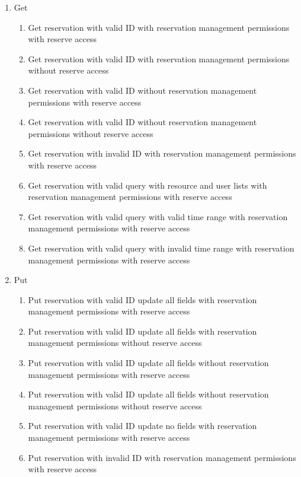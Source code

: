 \documentclass[12pt]{article}
\begin{document}
\begin{enumerate}
\begin{enumerate}
\begin{enumerate}
        \end{enumerate}
        \item Get
        \begin{enumerate}
            \item Get reservation with valid ID with reservation management permissions with reserve access
            \item Get reservation with valid ID with reservation management permissions without reserve access
            \item Get reservation with valid ID without reservation management permissions with reserve access
            \item Get reservation with valid ID without reservation management permissions without reserve access
            \item Get reservation with invalid ID with reservation management permissions with reserve access
            \item Get reservation with valid query with resource and user lists with reservation management permissions with reserve access
            \item Get reservation with valid query with valid time range with reservation management permissions with reserve access
            \item Get reservation with valid query with invalid time range with reservation management permissions with reserve access    
        \end{enumerate}
        \item Put
        \begin{enumerate}
            \item Put reservation with valid ID update all fields with reservation management permissions with reserve access
            \item Put reservation with valid ID update all fields with reservation management permissions without reserve access
            \item Put reservation with valid ID update all fields without reservation management permissions with reserve access
            \item Put reservation with valid ID update all fields without reservation management permissions without reserve access
            \item Put reservation with valid ID update no fields with reservation management permissions with reserve access
            \item Put reservation with invalid ID with reservation management permissions with reserve access

\end{enumerate}
\end{enumerate}
\end{enumerate}
\end{document}
